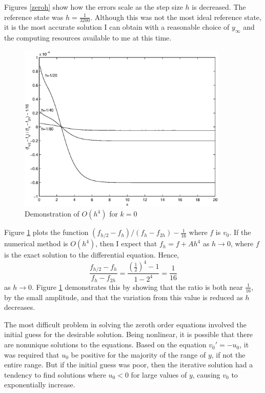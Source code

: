 \documentclass[10pt,a4paper]{report}
\begin{document}
Figures \ref{zeroh} show how the errors scale as the step size $h$ is decreased. The reference state was $h = \frac{1}{3200}$. Although this was not the most ideal reference state, it is the most accurate solution I can obtain with a reasonable choice of $y_\infty$ and the computing resources available to me at this time.

\clearpage

\begin{figure}[t]
\centering
\includegraphics[width=10cm]{pics/v0ord}
\caption{Demonstration of $O(h^4)$ for $k=0$}
\label{zerohorder}
\end{figure}

Figure \ref{zerohorder} plots the function $(f_{h/2} - f_h) / (f_h - f_{2h}) - \frac{1}{16}$ where $f$ is $v_0$. If the numerical method is $O(h^4)$, then I expect that $f_h = f + Ah^4$ as $h \rightarrow 0$, where $f$ is the exact solution to the differential equation. Hence,
\begin{equation*}
\frac{f_{h/2} - f_h}{f_h - f_{2h}} = \frac{\left(\frac{1}{2}\right)^4 - 1}{1 - 2^4} = \frac{1}{16}
\end{equation*}
as $h \rightarrow 0$. Figure \ref{zerohorder} demonstrates this by showing that the ratio is both near $\frac{1}{16}$, by the small amplitude, and that the variation from this value is reduced as $h$ decreases.

The most difficult problem in solving the zeroth order equations involved the initial guess for the desirable solution. Being nonlinear, it is possible that there are nonunique solutions to the equations. Based on the equation $v_0' = -u_0$, it was required that $u_0$ be positive for the majority of the range of $y$, if not the entire range. But if the initial guess was poor, then the iterative solution had a tendency to find solutions where $u_0 < 0$ for large values of $y$, causing $v_0$ to exponentially increase.
\end{document}
